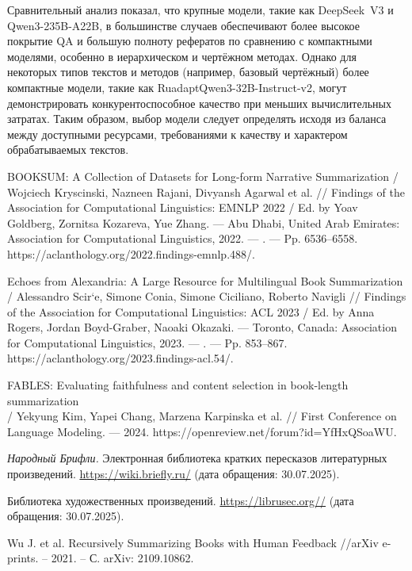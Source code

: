 \documentclass{article}
\begin{document}
Сравнительный анализ показал, что крупные модели, такие как DeepSeek~V3 и Qwen3-\allowbreak 235B-\allowbreak A22B, в большинстве случаев обеспечивают более высокое покрытие QA и 
большую полноту рефератов по сравнению с компактными моделями, особенно в иерархическом и чертёжном методах. 
Однако для некоторых типов текстов и методов (например, базовый чертёжный) более компактные модели, такие как RuadaptQwen3-\allowbreak 32B-\allowbreak Instruct-\allowbreak v2, 
могут демонстрировать конкурентоспособное качество при меньших вычислительных затратах. 
Таким образом, выбор модели следует определять исходя из баланса между доступными ресурсами, требованиями к качеству и характером обрабатываемых текстов.


\begin{thebibliography}{99}
BOOKSUM: A Collection of Datasets for Long-form Narrative Summarization / Wojciech Kryscinski, Nazneen Rajani, Divyansh Agarwal et al. // Findings of the Association for Computational Linguistics: EMNLP 2022 / Ed. by Yoav Goldberg, Zornitsa Kozareva, Yue Zhang. — Abu Dhabi, United Arab Emirates: Association for Computational Linguistics, 2022. — . — Pp. 6536–6558. https://aclanthology.org/2022.findings-emnlp.488/.

Echoes from Alexandria: A Large Resource for Multilingual Book Summarization / Alessandro Scir`e, Simone Conia, Simone Ciciliano, Roberto Navigli // Findings of the Association for Computational Linguistics: ACL 2023 / Ed. by Anna Rogers, Jordan Boyd-Graber, Naoaki Okazaki. — Toronto, Canada: Association for Computational Linguistics, 2023. — . — Pp. 853–867. https://aclanthology.org/2023.findings-acl.54/.

FABLES: Evaluating faithfulness and content selection in book-length summarization \\/ Yekyung Kim, Yapei Chang, Marzena Karpinska et al. // First Conference on Language Modeling. — 2024. https://openreview.net/forum?id=YfHxQSoaWU.

\textit{Народный Брифли.}  
Электронная библиотека кратких пересказов литературных произведений.  
\url{https://wiki.briefly.ru/} (дата обращения: 30.07.2025).

Библиотека художественных произведений.  
\url{https://librusec.org//} (дата обращения: 30.07.2025).

Wu J. et al. Recursively Summarizing Books with Human Feedback //arXiv e-prints. – 2021. – С. arXiv: 2109.10862.


\end{thebibliography}
\end{document}
